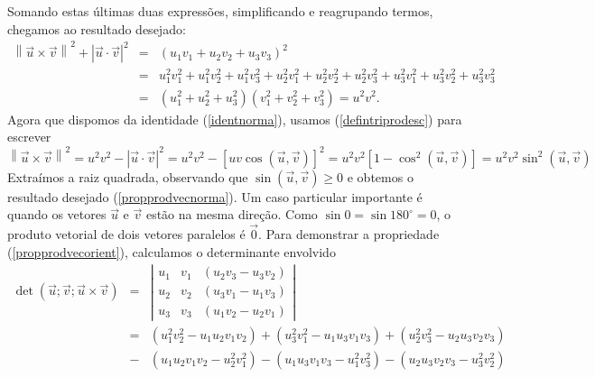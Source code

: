 Somando estas últimas duas expressões, simplificando e reagrupando termos, chegamos ao resultado desejado:
\begin{eqnarray*}
\left\|\vec{u}\times \vec{v}\right\|^2+\left|\vec{u}\cdot \vec{v}\right|^2&=&\left(u_1v_1+u_2v_2+u_3v_3\right)^2\\
&=&u_1^2v_1^2+u_1^2v_2^2+u_1^2v_3^2+u_2^2v_1^2+u_2^2v_2^2+u_2^2v_3^2+u_3^2v_1^2+u_3^2v_2^2+u_3^2v_3^2\\
&=&\left(u_1^2+u_2^2+u_3^2\right)\left(v_1^2+v_2^2+v_3^2\right)=u^2v^2.
\end{eqnarray*}
Agora que dispomos da identidade (\ref{identnorma}), usamos (\ref{defintriprodesc}) para escrever
\begin{equation*}\left\|\vec{u}\times \vec{v}\right\|^2=u^2v^2-\left|\vec{u}\cdot \vec{v}\right|^2=u^2v^2-\left[uv\cos\left(\vec{u},\vec{v}\right)\right]^2=u^2v^2\left[1-\cos^2\left(\vec{u},\vec{v}\right)\right]=u^2v^2\sin^2\left(\vec{u},\vec{v}\right)
\end{equation*}
Extraímos a raiz quadrada, observando que $\sin\left(\vec{u},\vec{v}\right)\geq 0$ e obtemos o resultado desejado (\ref{propprodvecnorma}).
Um caso particular importante é quando os vetores $\vec{u}$ e $\vec{v}$ estão na mesma direção. Como $\sin 0= \sin 180^\circ=0$, o produto vetorial de dois vetores paralelos é $\vec{0}$.
Para demonstrar a propriedade (\ref{propprodvecorient}), calculamos o determinante envolvido
\begin{eqnarray*}
\det\left(\vec{u};\vec{v};\vec{u}\times\vec{v}\right)&=&\left|
\begin{array}{ccc}
u_1 & v_1 & \left(u_2v_3-u_3v_2\right)\\
u_2 & v_2 & \left(u_3v_1-u_1v_3\right)\\
u_3 & v_3 &  \left(u_1v_2-u_2v_1\right)
\end{array}
\right|\\
&=&\left(u_1^2v_2^2-u_1u_2v_1v_2\right)+\left(u_3^2v_1^2-u_1u_3v_1v_3\right)+\left(u_2^2v_3^2-u_2u_3v_2v_3\right)\\
&-&\left(u_1u_2v_1v_2-u_2^2v_1^2\right)-\left(u_1u_3v_1v_3-u_1^2v_3^2\right)-\left(u_2u_3v_2v_3-u_3^2v_2^2\right)
\end{eqnarray*}
